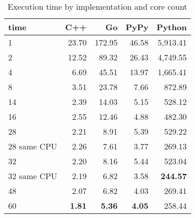 \begin{table}[ht]
    \centering
    \begin{tabular}{lrrrr}
        \hline
        time         & C++             & Go            & PyPy          & Python     \\
        \hline
        1            & 23.70           & 172.95        & 46.58         & 5,913.41        \\
        2            & 12.52           & 89.32         & 26.43         & 4,749.55        \\
        4            & 6.69            & 45.51         & 13.97         & 1,665.41        \\
        8	           & 3.51  	         & 23.78 	       & 7.66          & 872.89          \\
        14           & 2.39            & 14.03         & 5.15          & 528.12          \\
        16           & 2.55            & 12.46         & 4.88          & 482.30          \\
        28           & 2.21            & 8.91          & 5.39          & 529.22          \\
        28 same CPU  & 2.26            & 7.61          & 3.77          & 269.13          \\
        32           & 2.20            & 8.16          & 5.44          & 523.04          \\
        32 same CPU  & 2.19            & 6.82          & 3.58          & \textbf{244.57} \\
        48           & 2.07            & 6.82          & 4.03          & 269.41          \\
        60           & \textbf{1.81}   & \textbf{5.36} & \textbf{4.05} & 258.44          \\
        \hline
    \end{tabular}
    \caption{Execution time by implementation and core count}
    \label{tab:server-execution-time}
\end{table}
